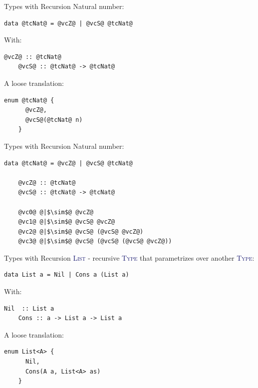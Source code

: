 \documentclass[xcolor={usenames,dvipsnames}]{beamer}
\newcommand{\htycon}[1]{\textcolor{MidnightBlue}{\textsc{#1}}}
\begin{document}
\begin{frame}[fragile]{Types with Recursion}
  Natural number:
  \begin{lstlisting}[style=hask]
    data @tcNat@ = @vcZ@ | @vcS@ @tcNat@
  \end{lstlisting}

  With:
  \begin{lstlisting}[style=hask]
    @vcZ@ :: @tcNat@
    @vcS@ :: @tcNat@ -> @tcNat@
  \end{lstlisting}

  A loose translation:
  \begin{lstlisting}[style=hask]
    enum @tcNat@ {
      @vcZ@,
      @vcS@(@tcNat@ n)
    }
  \end{lstlisting}
\end{frame}

\begin{frame}[fragile]{Types with Recursion}
  Natural number:
  \begin{lstlisting}[style=hask]
    data @tcNat@ = @vcZ@ | @vcS@ @tcNat@

    @vcZ@ :: @tcNat@
    @vcS@ :: @tcNat@ -> @tcNat@

    @vc0@ @|$\sim$@ @vcZ@
    @vc1@ @|$\sim$@ @vcS@ @vcZ@
    @vc2@ @|$\sim$@ @vcS@ (@vcS@ @vcZ@)
    @vc3@ @|$\sim$@ @vcS@ (@vcS@ (@vcS@ @vcZ@))
  \end{lstlisting}
\end{frame}

\begin{frame}[fragile]{Types with Recursion}
  \htycon{List} - recursive \htycon{Type} that parametrizes over another \htycon{Type}:
  \begin{lstlisting}[style=hask]
    data List a = Nil | Cons a (List a)
  \end{lstlisting}

  With:
  \begin{lstlisting}[style=hask]
    Nil  :: List a
    Cons :: a -> List a -> List a
  \end{lstlisting}

  A loose translation:
  \begin{lstlisting}[style=hask]
    enum List<A> {
      Nil,
      Cons(A a, List<A> as)
    }
  \end{lstlisting}
\end{frame}
\end{document}

